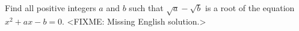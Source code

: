 \problem
Find all positive integers $a$ and $b$ such that $\sqrt{a} - \sqrt{b}$ is a root
of the equation $x^2 + a x - b = 0$.
\solution
<FIXME: Missing English solution.>
\endproblem
